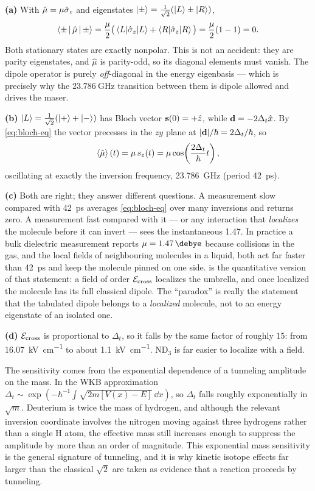\begin{solution}
\textbf{(a)} With $\hat\mu = \mu\hat{\sigma}_z$ and eigenstates
$\ket{\pm} = \tfrac{1}{\sqrt2}(\ket{L}\pm\ket{R})$,
\[
\Braket{\pm|\hat\mu|\pm} = \frac{\mu}{2}\big(\braket{L|\hat{\sigma}_z|L} + \braket{R|\hat{\sigma}_z|R}\big)
 = \frac{\mu}{2}(1-1) = 0 .
\]
Both stationary states are exactly nonpolar. This is not an accident: they are parity
eigenstates, and $\hat\mu$ is parity-odd, so its diagonal elements must vanish. The
dipole operator is purely \emph{off}-diagonal in the energy eigenbasis --- which is
precisely why the $\SI{23.786}{\giga\hertz}$ transition between them is dipole allowed
and drives the maser.

\textbf{(b)} $\ket{L} = \tfrac{1}{\sqrt2}(\ket{+}+\ket{-})$ has Bloch vector
$\mathbf{s}(0) = +\hat{z}$, while $\mathbf{d} = -2\Delta_t\hat{x}$. By \cref{eq:bloch-eq} the
vector precesses in the $zy$ plane at $|\mathbf{d}|/\hbar = 2\Delta_t/\hbar$, so
\[
\Braket{\hat\mu}(t) = \mu\, s_z(t) = \mu\cos\!\left(\frac{2\Delta_t}{\hbar}t\right),
\]
oscillating at exactly the inversion frequency, \SI{23.786}{\giga\hertz}
(period \SI{42}{\pico\second}).

\textbf{(c)} Both are right; they answer different questions. A measurement slow
compared with \SI{42}{\pico\second} averages \cref{eq:bloch-eq} over many inversions and
returns zero. A measurement fast compared with it --- or any interaction that
\emph{localizes} the molecule before it can invert --- sees the instantaneous
\SI{1.47}{\debye}. In practice a bulk dielectric measurement reports
$\mu=\SI{1.47}{\debye}$ because collisions in the gas, and the local fields of
neighbouring molecules in a liquid, both act far faster than \SI{42}{\pico\second} and
keep the molecule pinned on one side.  is the quantitative version of that
statement: a field of order $\mathcal{E}_{\rm cross}$ localizes the umbrella, and once
localized the molecule has its full classical dipole. The ``paradox'' is really the
statement that the tabulated dipole belongs to a \emph{localized} molecule, not to an
energy eigenstate of an isolated one.

\textbf{(d)} $\mathcal{E}_{\rm cross}$ is proportional to $\Delta_t$, so it falls by the
same factor of roughly $15$: from \SI{16.07}{\kilo\volt\per\centi\meter} to about
\SI{1.1}{\kilo\volt\per\centi\meter}. ND$_3$ is far easier to localize with a field.

The sensitivity comes from the exponential dependence of a tunneling amplitude on the
mass. In the WKB approximation
$\Delta_t \sim \exp\!\left(-\hbar^{-1}\!\int\!\sqrt{2m[V(x)-E]}\,\dd x\right)$, so
$\Delta_t$ falls roughly exponentially in $\sqrt{m}$. Deuterium is twice the mass of
hydrogen, and although the relevant inversion coordinate involves the nitrogen moving
against three hydrogens rather than a single H atom, the effective mass still increases
enough to suppress the amplitude by more than an order of magnitude. This exponential
mass sensitivity is the general signature of tunneling, and it is why kinetic isotope
effects far larger than the classical $\sqrt{2}$ are taken as evidence that a reaction
proceeds by tunneling.
\end{solution}
